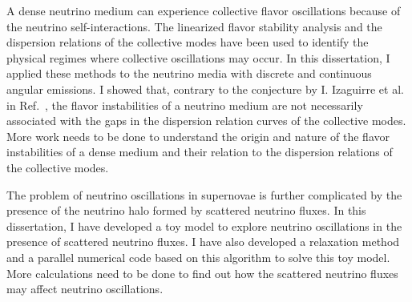 A dense neutrino medium can experience collective flavor oscillations because of the neutrino self-interactions. The linearized flavor stability analysis and the dispersion relations of the collective modes have been used to identify the physical regimes where collective oscillations may occur. In this dissertation, I applied these methods to the neutrino media with discrete and continuous angular emissions. I showed that, contrary to the conjecture by I. Izaguirre et al. in Ref.~\cite{Izaguirre2016a}, the flavor instabilities of a neutrino medium are not necessarily associated with the gaps in the dispersion relation curves of the collective modes. More work needs to be done to understand the origin and nature of the flavor instabilities of a dense medium and their relation to the dispersion relations of the collective modes.


The problem of neutrino oscillations in supernovae is further complicated by the presence of the neutrino halo formed by scattered neutrino fluxes. In this dissertation, I have developed a toy model to explore neutrino oscillations in the presence of scattered neutrino fluxes. I have also developed a relaxation method and a parallel numerical code based on this algorithm to solve this toy model. More calculations need to be done to find out how the scattered neutrino fluxes may affect neutrino oscillations.


